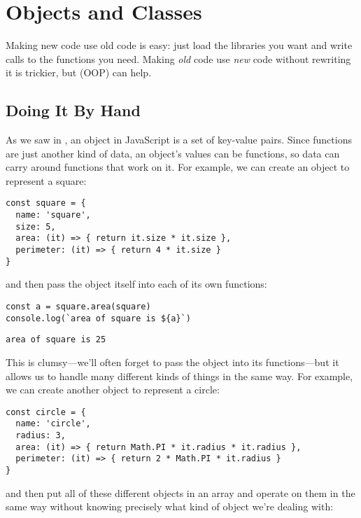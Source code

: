 \chapter{Objects and Classes}\label{s:oop}

Making new code use old code is easy:
just load the libraries you want and write calls to the functions you need.
Making \emph{old} code use \emph{new} code without rewriting it is trickier,
but  (OOP) can help.

\section{Doing It By Hand}\label{s:oop-manual}

As we saw in ,
an object in JavaScript is a set of key-value pairs.
Since functions are just another kind of data,
an object's values can be functions,
so data can carry around functions that work on it.
For example,
we can create an object to represent a square:

\begin{verbatim}
const square = {
  name: 'square',
  size: 5,
  area: (it) => { return it.size * it.size },
  perimeter: (it) => { return 4 * it.size }
}
\end{verbatim}

\noindent
and then pass the object itself into each of its own functions:

\begin{verbatim}
const a = square.area(square)
console.log(`area of square is ${a}`)
\end{verbatim}

\begin{verbatim}
area of square is 25
\end{verbatim}

This is clumsy---we'll often forget to pass the object into its functions---but
it allows us to handle many different kinds of things in the same way.
For example,
we can create another object to represent a circle:

\begin{verbatim}
const circle = {
  name: 'circle',
  radius: 3,
  area: (it) => { return Math.PI * it.radius * it.radius },
  perimeter: (it) => { return 2 * Math.PI * it.radius }
}
\end{verbatim}

\noindent
and then put all of these different objects in an array
and operate on them in the same way
without knowing precisely what kind of object we're dealing with:

